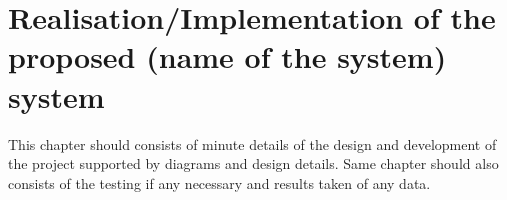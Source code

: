 
\chapter{Realisation/Implementation of the proposed (name of the system) system}
   This chapter should consists of minute details of the design and development of the project supported by  diagrams  and design details. Same chapter should also consists of the testing if any necessary and results taken of any data.